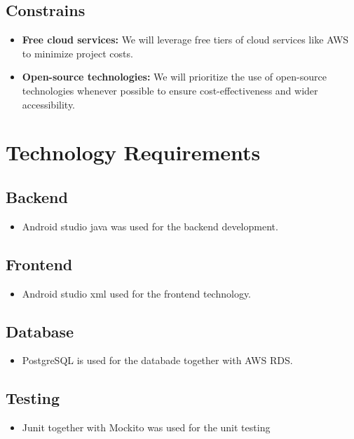 \documentclass[hidelinks, 12pt, a4paper]{article}
\begin{document}
\begin{itemize}
    \subsection{Constrains}
    \begin{itemize}
        \item \textbf{Free cloud services:} We will leverage free tiers of cloud services like AWS to minimize project costs.
        \item \textbf{Open-source technologies:} We will prioritize the use of open-source technologies whenever possible to ensure cost-effectiveness and wider accessibility.
    \end{itemize}


    \section{Technology Requirements}
    \subsection{Backend}
    \begin{itemize}
        \item Android studio java was used for the backend development.
    \end{itemize}
    \subsection{Frontend}
    \begin{itemize}
        \item Android studio xml used for the frontend technology.
    \end{itemize}
    \subsection{Database}
    \begin{itemize}
        \item PostgreSQL is used for the databade together with AWS RDS.
    \end{itemize}
    \subsection{Testing}
    \begin{itemize}
        \item Junit together with Mockito was used for the unit testing
    \end{itemize}

\end{itemize}
\end{document}
